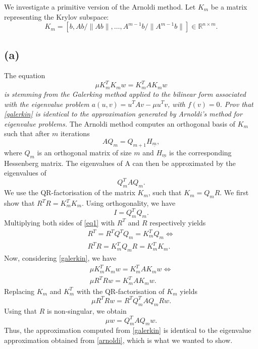 We investigate a primitive version of the Arnoldi method. Let $K_m$ be a matrix representing the Krylov subspace: 
\begin{equation}
K_m = [b, Ab/ \|Ab\|,\dots,A^{m-1}b/ \|A^{m-1}b\|]
\in\mathbb{R}^{n\times m}.
\end{equation}
\subsection{(a)}
The equation
\begin{equation}\label{galerkin}
\mu K_m^TK_mw = K_m^TAK_mw
\end{equation}
\emph{is stemming from the Galerking method applied to the bilinear form associated with the eigenvalue problem $a(u,v) = u^TAv-\mu u^Tv$, with $f(v) = 0$. Prov that \eqref{galerkin} is identical to the approximation generated by Arnoldi's method for eigenvalue problems.}
The Arnoldi method computes an orthogonal basis of $K_m$ such that after $m$ iterations
\begin{equation}
AQ_m = Q_{m+1}H_{\underline{m}}, 
\end{equation}
where $Q_m$ is an orthogonal matrix of size $m$ and $H_{\underline{m}}$ is the corresponding Hessenberg matrix. The eigenvalues of A can then be approximated by the eigenvalues of 
\begin{equation}\label{arnoldi}
Q_m^TAQ_m.
\end{equation}
We use the QR-factorisation of the matrix $K_m$, such that $K_m = Q_mR$. We first show that $R^TR = K_m^TK_m$. Using orthogonality, we have
\begin{equation}\label{eq1}
I = Q^T_mQ_m.
\end{equation}
Multiplying both sides of \eqref{eq1} with $R^T$ and $R$ respectively yields
\begin{equation}
\begin{aligned}
R^T = R^TQ^TQ_m = K^T_mQ_m\Leftrightarrow\\
R^TR  = K^T_mQ_mR = K_m^TK_m.
\end{aligned}
\end{equation}
Now, considering \eqref{galerkin}, we have
\begin{equation}
\begin{aligned}
\mu K_m^TK_mw = K_m^TAK_mw\Leftrightarrow\\
\mu R^TRw = K_m^TAK_mw.
\end{aligned}
\end{equation}
Replacing $K_m$ and $K_m^T$ with the QR-factorisation of $K_m$ yields
\begin{equation}
\mu R^TRw = R^TQ_m^TAQ_mRw.
\end{equation}
Using that $R$ is non-singular, we obtain
\begin{equation}
\mu w = Q_m^TAQ_mw.
\end{equation}
Thus, the approximation computed from \eqref{galerkin} is identical to the eigenvalue approximation obtained from \eqref{arnoldi}, which is what we wanted to show.
